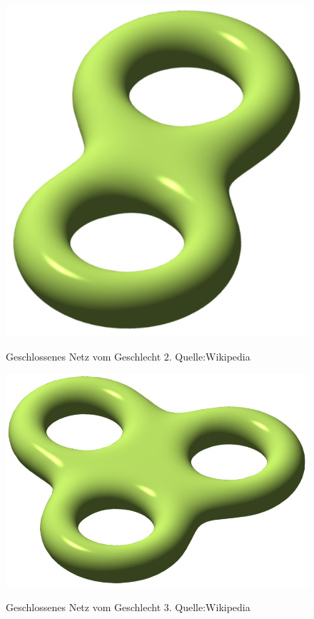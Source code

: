 \begin{figure}[H]
    \centering
    \includegraphics[scale=1.0]{images/Double_torus.png}
    \label{fig:closed-mesh-gender2}
    \caption{Geschlossenes Netz vom Geschlecht $2$. Quelle:Wikipedia}
\end{figure}

\begin{figure}[H]
    \centering
    \includegraphics[scale=1.0]{images/Triple_torus.png}
    \label{fig:closed-mesh-gender3}
    \caption{Geschlossenes Netz vom Geschlecht $3$. Quelle:Wikipedia}
\end{figure}

